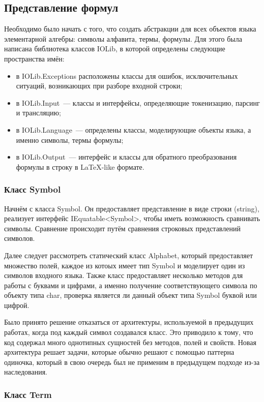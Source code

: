 \subsection{Представление формул}

Необходимо было начать с того, что создать абстракции для всех объектов языка элементарной алгебры: символы алфавита, термы, формулы. Для этого была написана библиотека классов IOLib, в которой определены следующие пространства имён:
\begin{itemize}
    \item в IOLib.Exceptions расположены классы для ошибок, исключительных ситуаций, возникающих при разборе входной строки;
    \item в IOLib.Input~--- классы и интерфейсы, определяющие токенизацию, парсинг и трансляцию;
    \item в IOLib.Language~--- определены классы, моделирующие объекты языка, а именно символы, термы  формулы;
    \item в IOLib.Output~--- интерфейс и классы для обратного преобразования формулы в строку в LaTeX-like формате.
\end{itemize}

\subsubsection{Класс Symbol}

Начнём с класса Symbol. Он предоставляет представление в виде строки (string), реализует интерфейс IEquatable<Symbol>, чтобы иметь возможность сравнивать символы. Сравнение происходит путём сравнения строковых представлений символов.

Далее следует рассмотреть статический класс Alphabet, который предоставляет множество полей, каждое из котоых имеет тип Symbol и моделирует один из символов входного языка. Также класс предоставляет несколько методов для работы с буквами и цифрами, а именно получение соответствующего символа по объекту типа char, проверка является ли данный объект типа Symbol буквой или цифрой.

Было принято решение отказаться от архитектуры, используемой в предыдущих работах, когда под каждый символ создавался класс. Это приводило к тому, что код содержал много однотипных сущностей без методов, полей и свойств. Новая архитектура решает задачи, которые обычно решают с помощью паттерна одиночка, который в свою очередь был не применим в предыдущем подходе из-за наследования.

\subsubsection{Класс Term}

